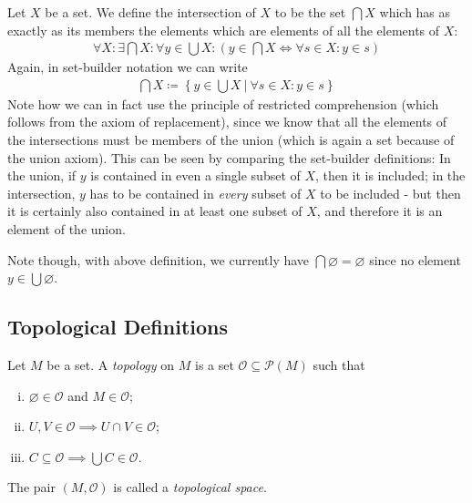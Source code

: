\begin{definition}[Intersection]
    Let \(X\) be a set. We define the intersection of \(X\) to be the set \(\bigcap X\) which has as exactly as its members the elements which are elements of all the elements of \(X\): 
    \begin{align*}
        \forall X: \exists \bigcap X : \forall y \in \bigcup X : \left( y \in \bigcap X \iff \forall s \in X : y \in s\right) 
    \end{align*}
    Again, in set-builder notation we can write \begin{align*}
        \bigcap X \coloneqq \left\{ y  \in \bigcup X \ \big| \ \forall s \in X: y \in s \right\} 
    \end{align*}
    Note how we can in fact use the principle of restricted comprehension (which follows from the axiom of replacement), since we know that all the elements of the intersections must be members of the union (which is again a set because of the union axiom). This can be seen by comparing the set-builder definitions: In the union, if \(y\) is contained in even a single subset of \(X\), then it is included; in the intersection, \(y\) has to be contained in \textit{every} subset of \(X\) to be included - but then it is certainly also contained in at least one subset of \(X\), and therefore it is an element of the union. 

    Note though, with above definition, we currently have \(\bigcap \varnothing = \varnothing \) since no element \(y \in \bigcup \varnothing \).  
\end{definition}

\subsection{Topological Definitions}

\begin{definition}[Topology]
    Let \(M\) be a set. A \textit{topology} on \(M\) is a set \(\mathcal{O} \subseteq \mathcal{P}(M)\) such that \begin{enumerate}[i)]
        \item \(\varnothing \in \mathcal{O}\) and \(M \in \mathcal{O}\); 
        \item \( U, V  \in \mathcal{O} \implies U \cap V  \in \mathcal{O} \);
        \item \(C \subseteq \mathcal{O} \implies \bigcup C \in \mathcal{O} \).
    \end{enumerate}
    The pair \((M, \mathcal{O})\) is called a \textit{topological space}.  
\end{definition}

